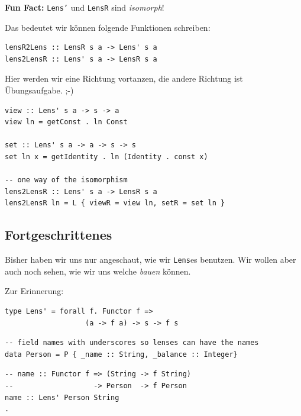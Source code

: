 \documentclass{beamer}
\begin{document}

\begin{frame}[fragile]

\textbf{Fun Fact:} \texttt{Lens'} und \texttt{LensR} sind \emph{isomorph}!
\pause
\smallskip\smallskip

Das bedeutet wir können folgende Funktionen schreiben:

\begin{verbatim}
lensR2Lens :: LensR s a -> Lens' s a
lens2LensR :: Lens' s a -> LensR s a
\end{verbatim}
\pause

Hier werden wir eine Richtung vortanzen, die andere Richtung ist Übungsaufgabe. ;-)

\begin{verbatim}
view :: Lens' s a -> s -> a
view ln = getConst . ln Const

set :: Lens' s a -> a -> s -> s
set ln x = getIdentity . ln (Identity . const x)

-- one way of the isomorphism
lens2LensR :: Lens' s a -> LensR s a
lens2LensR ln = L { viewR = view ln, setR = set ln }
\end{verbatim}
 
\end{frame}

\subsection{Fortgeschrittenes}

\begin{frame}[fragile]

Bisher haben wir uns nur angeschaut, wie wir \texttt{Lens}es benutzen. Wir wollen aber auch noch sehen, wie wir uns welche \emph{bauen} können.
\pause
\smallskip
\smallskip

Zur Erinnerung:
\begin{verbatim}
type Lens' = forall f. Functor f =>
                   (a -> f a) -> s -> f s
\end{verbatim}
\pause
\smallskip

\begin{verbatim}
-- field names with underscores so lenses can have the names
data Person = P { _name :: String, _balance :: Integer}
\end{verbatim}
\pause
\bigskip

\begin{verbatim}
-- name :: Functor f => (String -> f String)
--                   -> Person  -> f Person
name :: Lens' Person String
.
\end{verbatim}

\end{frame}
\end{document}

